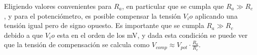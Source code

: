 Eligiendo valores convenientes para $R_a$, en particular que se cumpla que $R_a \gg R_c$, y para el potenci\'ometro, es posible compensar la tensi\'on $V_io$ aplicando una tensi\'on igual pero de signo opuesto.
Es importante que se cumpla $R_a \gg R_c$ debido a que $V_io$ esta en el orden de los mV, y dada esta condici\'on se puede ver que la tensi\'on de compensaci\'on se calcula como $V_{comp} \approx V_{pot}\cdot \frac{R_a}{R_c}$.
  